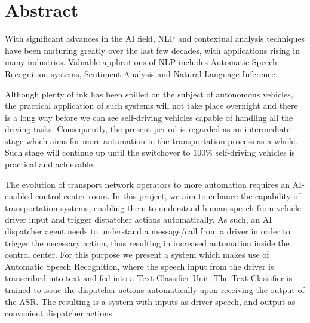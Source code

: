 \chapter*{Abstract}
\label{chap:abstract}
With significant advances in the \ac{AI} field, \ac{NLP} and contextual analysis techniques have been maturing greatly over the last few decades, with applications rising in many industries. Valuable applications of \ac{NLP} includes Automatic Speech Recognition systems, Sentiment Analysis and Natural Language Inference.

Although plenty of ink has been spilled on the subject of autonomous vehicles, the practical application of such systems will not take place overnight and there is a long way before we can see self-driving vehicles capable of handling all the driving tasks. Consequently, the present period is regarded as an intermediate stage which aims for more automation in the transportation process as a whole. Such stage will continue up until the switchover to $100\%$ self-driving vehicles is practical and achievable. 

The evolution of transport network operators to more automation requires an \ac{AI}-enabled control center room. In this project, we aim to enhance the capability of transportation systems, enabling them to understand human speech from vehicle driver input and trigger dispatcher actions automatically. As such, an \ac{AI} dispatcher agent needs to understand a message/call from a driver in order to trigger the necessary action, thus resulting in increased automation inside the control center. For this purpose we present a system which makes use of Automatic Speech Recognition, where the speech input from the driver is transcribed into text and fed into a Text Classifier Unit. The Text Classifier is trained to issue the dispatcher actions automatically upon receiving the output of the \ac{ASR}. The resulting is a system with inputs as driver speech, and output as convenient dispatcher actions.
